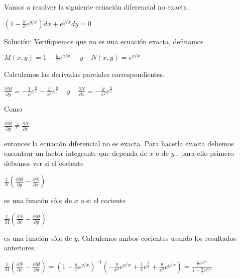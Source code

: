 \documentclass[l etterpaper,11pt]{article}
\begin{document}
Vamos a resolver la siguiente ecuación diferencial no exacta.
\begin{center}

$(1-\frac{y}{x}e^{y/x})dx+e^{y/x}dy=0$\\
\end{center}

Solución: Verifiquemos que no es una ecuación exacta, definamos
\begin{center}

$M\left(x,y\right)=1-\frac{y}{x}e^{y/x}\ \ \ \ \ \ y\ \ \ \ \ N\left(x,y\right)=e^{y/x}$\\
\end{center}

Calculemos las derivadas parciales correspondientes.
\begin{center}

$\frac{\partial M}{\partial y}=-\frac{1}{x}e^\frac{y}{x}-\frac{y}{x^2}e^\frac{y}{x}\ \ \ \ \ y\ \ \ \ \ \frac{\partial N}{\partial x}=-\frac{y}{x^2}e^\frac{y}{x}$\\

\end{center}

Como
\begin{center}

$\frac{\partial M}{\partial y}\neq\frac{\partial N}{\partial x}$\\
\end{center}

entonces la ecuación diferencial no es exacta. Para hacerla exacta debemos encontrar un factor integrante que dependa de $ x $ o de  $ y $ , para ello primero debemos ver si el cociente
\begin{center}


$\frac{1}{N}(\frac{\partial M}{\partial y}-\frac{\partial N}{\partial x}) $\\
\end{center}

es una función sólo de $ x $ o si el cociente
\begin{center}

$\frac{1}{M}(\frac{\partial N}{\partial x}-\frac{\partial M}{\partial y}) $\\
\end{center}

es una función sólo de $ y $. Calculemos ambos cocientes usando los resultados anteriores.
\begin{center}

$\frac{1}{M}\left(\frac{\partial N}{\partial x}-\frac{\partial M}{\partial y}\right)=\left(1-\frac{y}{x}e^{y/x}\right)^{-1}\left(-\frac{y}{x^2}e^{y/x}+\frac{1}{x}e^\frac{y}{x}+\frac{y}{x^2}e^{y/x}\right)=\frac{\frac{1}{x}e^{y/x}}{1-\frac{y}{x}e^{y/x}}$\\
\end{center}
\end{document}
